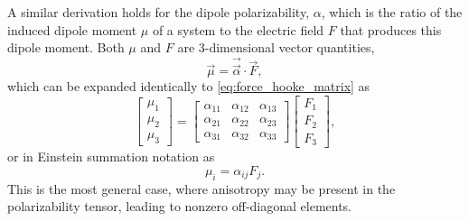 \documentclass[%
class = book,%
crop = false,%
float = true,%
multi = true,%
preview = false,%
]{standalone}
\begin{document}
A similar derivation holds for the dipole polarizability, \(\alpha\), which is the ratio of the induced dipole moment \(\mu\) of a system to the electric field \(F\) that produces this dipole moment. Both \(\mu\) and \(F\) are 3-dimensional vector quantities,
\begin{equation}
  \label{eq:phenomenological-polarizability}
  \vec{\mu} = \vec{\vec{\alpha}} \cdot \vec{F},
\end{equation}
which can be expanded identically to \eqref{eq:force_hooke_matrix} as
\begin{equation}
  \begin{bmatrix}
    \mu_{1} \\ \mu_{2} \\ \mu_{3}
  \end{bmatrix}
  =
  \begin{bmatrix}
    \alpha_{11} & \alpha_{12} & \alpha_{13} \\
    \alpha_{21} & \alpha_{22} & \alpha_{23} \\
    \alpha_{31} & \alpha_{32} & \alpha_{33}
  \end{bmatrix}
  \begin{bmatrix}
    F_{1} \\ F_{2} \\ F_{3}
  \end{bmatrix},
\end{equation}
or in Einstein summation notation as
\begin{equation}
  \label{eq:polarizability_einstein}
  \mu_{i} = \alpha_{ij} F_{j}.
\end{equation}
This is the most general case, where anisotropy may be present in the polarizability tensor, leading to nonzero off-diagonal elements.
\end{document}
